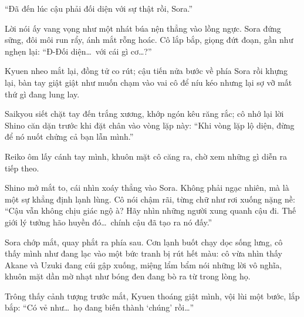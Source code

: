 \documentclass[../main.tex]{subfiles}
\begin{document}

\begin{center}
    ``Đã đến lúc cậu phải đối diện với sự thật rồi, Sora.''
\end{center}

Lời nói ấy vang vọng như một nhát búa nện thẳng vào lồng ngực. Sora đứng sững, đôi môi run rẩy, ánh mắt rỗng hoác. Cô lắp bắp, giọng đứt đoạn, gần như nghẹn lại: ``Đ-Đối diện\dots\ với cái gì cơ\dots?''

Kyuen nheo mắt lại, đồng tử co rút; cậu tiến nửa bước về phía Sora rồi khựng lại, bàn tay giật giật như muốn chạm vào vai cô để níu kéo nhưng lại sợ vỡ mất thứ gì đang lung lay.

Saikyou siết chặt tay đến trắng xương, khớp ngón kêu răng rắc; cô nhớ lại lời Shino căn dặn trước khi đặt chân vào vòng lặp này: ``Khi vòng lặp lộ diện, đừng để nó nuốt chửng cả bạn lẫn mình.''

Reiko ôm lấy cánh tay mình, khuôn mặt cô căng ra, chờ xem những gì diễn ra tiếp theo.

Shino mở mắt to, cái nhìn xoáy thẳng vào Sora. Không phải ngạc nhiên, mà là một sự khẳng định lạnh lùng. Cô nói chậm rãi, từng chữ như rơi xuống nặng nề: ``Cậu vẫn không chịu giác ngộ à? Hãy nhìn những người xung quanh cậu đi. Thế giới lý tưởng hão huyền đó\dots\ chính cậu đã tạo ra nó đấy.''


Sora chớp mắt, quay phắt ra phía sau. Cơn lạnh buốt chạy dọc sống lưng, cô thấy mình như đang lạc vào một bức tranh bị rút hết màu: cô vừa nhìn thấy Akane và Uzuki đang cúi gập xuống, miệng lẩm bẩm nói những lời vô nghĩa, khuôn mặt dần mờ nhạt như bóng đen đang bò ra từ trong lòng họ.

Trông thấy cảnh tượng trước mắt, Kyuen thoáng giật mình, vội lùi một bước, lắp bắp: ``Có vẻ như\dots\ họ đang biến thành `chúng' rồi\dots''
\end{document}

